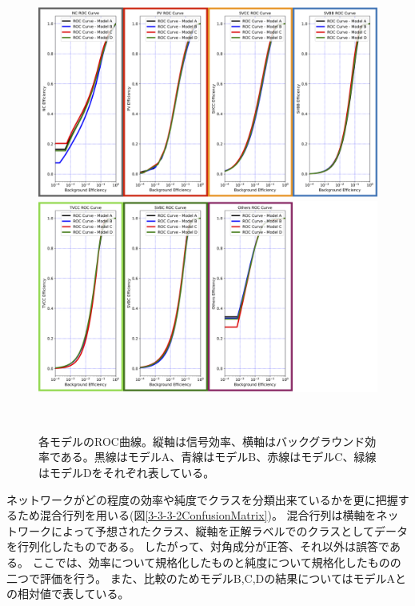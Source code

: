 \begin{figure}[htbp]
 \centering
  \begin{minipage}{1.0\textwidth}
   \centering
    \includegraphics[width=1.0\textwidth, clip]{Figure/3Networks/3-3-3-2ROC_Curve_1.png}
   \end{minipage}
   
   \begin{minipage}{1.0\textwidth}
   \centering
    \includegraphics[width=1.0\textwidth, clip]{Figure/3Networks/3-3-3-2ROC_Curve_2.png}
   \end{minipage}
  \caption[各モデルのROC曲線]{各モデルのROC曲線。縦軸は信号効率、横軸はバックグラウンド効率である。黒線はモデルA、青線はモデルB、赤線はモデルC、緑線はモデルDをそれぞれ表している。}
  \label{3-3-3-2ROC_Curve}
\end{figure}

ネットワークがどの程度の効率や純度でクラスを分類出来ているかを更に把握するため混合行列を用いる(図\ref{3-3-3-2ConfusionMatrix})。
混合行列は横軸をネットワークによって予想されたクラス、縦軸を正解ラベルでのクラスとしてデータを行列化したものである。
したがって、対角成分が正答、それ以外は誤答である。
ここでは、効率について規格化したものと純度について規格化したものの二つで評価を行う。
また、比較のためモデルB,C,Dの結果についてはモデルAとの相対値で表している。

